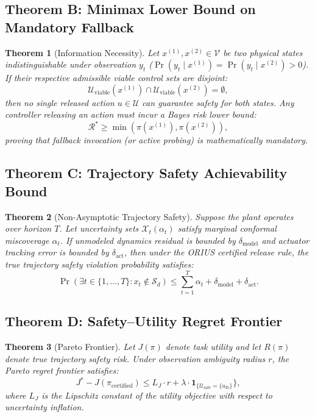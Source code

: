 \documentclass[conference]{IEEEtran}
\newtheorem{theorem}{Theorem}
\begin{document}
\subsection{Theorem B: Minimax Lower Bound on Mandatory Fallback}
\begin{theorem}[Information Necessity]
Let $x^{(1)}, x^{(2)} \in \mathcal{V}$ be two physical states indistinguishable under observation $y_t$ ($\Pr(y_t \mid x^{(1)}) = \Pr(y_t \mid x^{(2)}) > 0$). If their respective admissible viable control sets are disjoint:
\begin{equation}
\mathcal{U}_{\mathrm{viable}}(x^{(1)}) \cap \mathcal{U}_{\mathrm{viable}}(x^{(2)}) = \emptyset,
\end{equation}
then no single released action $u \in \mathcal{U}$ can guarantee safety for both states. Any controller releasing an action must incur a Bayes risk lower bound:
\begin{equation}
\mathcal{R}^* \ge \min(\pi(x^{(1)}), \pi(x^{(2)})),
\end{equation}
proving that fallback invocation (or active probing) is mathematically mandatory.
\end{theorem}

\subsection{Theorem C: Trajectory Safety Achievability Bound}
\begin{theorem}[Non-Asymptotic Trajectory Safety]
Suppose the plant operates over horizon $T$. Let uncertainty sets $\mathcal{X}_t(\alpha_t)$ satisfy marginal conformal miscoverage $\alpha_t$. If unmodeled dynamics residual is bounded by $\delta_{\mathrm{model}}$ and actuator tracking error is bounded by $\delta_{\mathrm{act}}$, then under the ORIUS certified release rule, the true trajectory safety violation probability satisfies:
\begin{equation}
\Pr\left( \exists t \in \{1, \dots, T\} : x_t \notin \mathcal{S}_d \right) \le \sum_{t=1}^T \alpha_t + \delta_{\mathrm{model}} + \delta_{\mathrm{act}}.
\end{equation}
\end{theorem}

\subsection{Theorem D: Safety--Utility Regret Frontier}
\begin{theorem}[Pareto Frontier]
Let $J(\pi)$ denote task utility and let $R(\pi)$ denote true trajectory safety risk. Under observation ambiguity radius $r$, the Pareto regret frontier satisfies:
\begin{equation}
J^* - J(\pi_{\mathrm{certified}}) \le L_J \cdot r + \lambda \cdot \mathbf{1}_{\{\mathcal{U}_{\mathrm{safe}} = \{u_{\mathrm{fb}}\}}\},
\end{equation}
where $L_J$ is the Lipschitz constant of the utility objective with respect to uncertainty inflation.
\end{theorem}
\end{document}

